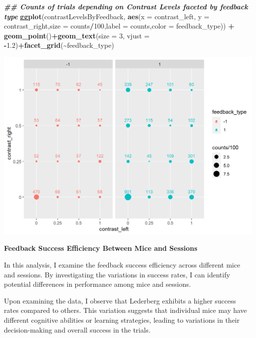 \documentclass[
]{article}
\newenvironment{Shaded}{\begin{snugshade}}{\end{snugshade}}
\newcommand{\AttributeTok}[1]{\textcolor[rgb]{0.13,0.29,0.53}{#1}}
\newcommand{\DecValTok}[1]{\textcolor[rgb]{0.00,0.00,0.81}{#1}}
\newcommand{\DocumentationTok}[1]{\textcolor[rgb]{0.56,0.35,0.01}{\textbf{\textit{#1}}}}
\newcommand{\FloatTok}[1]{\textcolor[rgb]{0.00,0.00,0.81}{#1}}
\newcommand{\FunctionTok}[1]{\textcolor[rgb]{0.13,0.29,0.53}{\textbf{#1}}}
\newcommand{\NormalTok}[1]{#1}
\newcommand{\SpecialCharTok}[1]{\textcolor[rgb]{0.81,0.36,0.00}{\textbf{#1}}}
\begin{document}
\begin{Shaded}
\begin{Highlighting}[]
\DocumentationTok{\#\# Counts of trials depending on Contrast Levels faceted by feedback type}
\FunctionTok{ggplot}\NormalTok{(contrastLevelsByFeedback, }\FunctionTok{aes}\NormalTok{(}\AttributeTok{x =}\NormalTok{ contrast\_left, }\AttributeTok{y =}\NormalTok{ contrast\_right,}\AttributeTok{size =}\NormalTok{ counts}\SpecialCharTok{/}\DecValTok{100}\NormalTok{,}\AttributeTok{label =}\NormalTok{ counts,}\AttributeTok{color =}\NormalTok{ feedback\_type)) }\SpecialCharTok{+}
  \FunctionTok{geom\_point}\NormalTok{()}\SpecialCharTok{+}\FunctionTok{geom\_text}\NormalTok{(}\AttributeTok{size =} \DecValTok{3}\NormalTok{, }\AttributeTok{vjust =} \SpecialCharTok{{-}}\FloatTok{1.2}\NormalTok{)}\SpecialCharTok{+}\FunctionTok{facet\_grid}\NormalTok{(}\SpecialCharTok{\textasciitilde{}}\NormalTok{feedback\_type)}
\end{Highlighting}
\end{Shaded}

\includegraphics{images/unnamed-chunk-10-2.png}

\textbf{Feedback Success Efficiency Between Mice and Sessions}

In this analysis, I examine the feedback success efficiency across
different mice and sessions. By investigating the variations in success
rates, I can identify potential differences in performance among mice
and sessions.

Upon examining the data, I observe that Lederberg exhibits a higher
success rates compared to others. This variation suggests that
individual mice may have different cognitive abilities or learning
strategies, leading to variations in their decision-making and overall
success in the trials.
\end{document}
